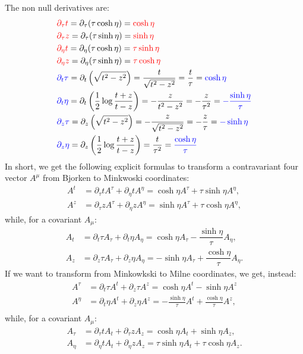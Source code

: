 \documentclass[12pt, a4paper]{report}
\begin{document}
The non null derivatives are:
\begin{align*}
&{\color{red}\partial_{\tau} t}=\partial_{\tau} (\tau \cosh \eta) = {\color{red}\cosh \eta}\\
&{\color{red}\partial_{\tau} z}=\partial_{\tau} (\tau \sinh \eta) = {\color{red}\sinh \eta}\\
&{\color{red}\partial_{\eta} t}=\partial_{\eta} (\tau \cosh \eta) = {\color{red}\tau \sinh \eta}\\
&{\color{red}\partial_{\eta} z}=\partial_{\eta} (\tau \sinh \eta) = {\color{red}\tau \cosh \eta}\\
&{\color{blue}\partial_{t} \tau}=\partial_{t} \left( \sqrt{t^2-z^2} \right) = \frac{t}{\sqrt{t^2-z^2}} =  \frac{t}{\tau}={\color{blue} \cosh \eta }\\
&{\color{blue}\partial_{t} \eta}=\partial_{t} \left( \frac{1}{2}\log\frac{t+z}{t-z} \right) = -\frac{z}{t^2-z^2}=-\frac{z}{\tau^2}={\color{blue}-\frac{\sinh \eta}{\tau}}\\
&{\color{blue}\partial_{z} \tau}=\partial_{z} \left( \sqrt{t^2-z^2} \right) = -\frac{z}{\sqrt{t^2-z^2}}=-\frac{z}{\tau}={\color{blue} - \sinh \eta }\\
&{\color{blue}\partial_{z} \eta}=\partial_{z} \left( \frac{1}{2}\log\frac{t+z}{t-z} \right) = \frac{t}{\tau^2}={\color{blue} \frac{\cosh \eta}{\tau}}\\
\end{align*}
In short, we get the following explicit formulas to transform a contravariant four vector $A^{\mu}$ from Bjorken to Minkwoski coordinates:
\begin{align}
A^t&=\partial_{\tau} t A^{\tau} + \partial_{\eta} t A^{\eta}=\cosh\eta A^{\tau} + \tau\sinh\eta A^{\eta},\\
A^z&=\partial_{\tau} z A^{\tau} + \partial_{\eta} z A^{\eta}=\sinh \eta A^{\tau} + \tau\cosh\eta A^{\eta},
\end{align}
while, for a covariant $A_{\mu}$:
\begin{align}
A_t&=\partial_t \tau A_{\tau} + \partial_t \eta A_{\eta}=\cosh\eta A_{\tau}- \dfrac{\sinh\eta}{\tau} A_{\eta},\\
A_z&=\partial_z \tau A_{\tau} + \partial_z \eta A_{\eta}=-\sinh\eta A_{\tau} + \dfrac{\cosh\eta}{\tau} A_{\eta}.
\end{align}
If we want to transform from Minkowkski to Milne coordinates, we get, instead:
\begin{align}
A^{\tau}&=\partial_t \tau A^t + \partial_z \tau A^z=\cosh \eta A^t - \sinh \eta A^z\\
A^{\eta}&=\partial_t \eta A^t + \partial_z \eta A^z=-\frac{\sinh \eta}{\tau} A^t + \frac{\cosh \eta}{\tau} A^z,\\
\end{align}
while, for a covariant $A_{\mu}$:
\begin{align}
A_{\tau}&=\partial_{\tau} t A_t + \partial_{\tau} z A_z = \cosh \eta A_t + \sinh \eta A_z,\\
A_{\eta}&=\partial_{\eta} t A_t + \partial_{\eta} z A_z = \tau \sinh \eta A_t + \tau \cosh \eta A_z.
\end{align}
\end{document}
